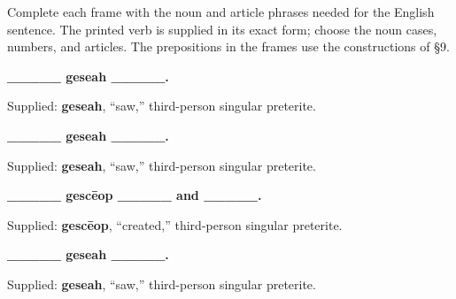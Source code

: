 Complete each frame with the noun and article phrases needed for the English sentence. The printed verb is supplied in its exact form; choose the noun cases, numbers, and articles. The prepositions in the frames use the constructions of §9.


\textbf{\_\_\_\_\_ geseah \_\_\_\_\_.}\par\nobreak

Supplied: \textbf{geseah}, “saw,” third-person singular preterite.


\textbf{\_\_\_\_\_ geseah \_\_\_\_\_.}\par\nobreak

Supplied: \textbf{geseah}, “saw,” third-person singular preterite.


\textbf{\_\_\_\_\_ gescēop \_\_\_\_\_ and \_\_\_\_\_.}\par\nobreak

Supplied: \textbf{gescēop}, “created,” third-person singular preterite.


\textbf{\_\_\_\_\_ geseah \_\_\_\_\_.}\par\nobreak

Supplied: \textbf{geseah}, “saw,” third-person singular preterite.


